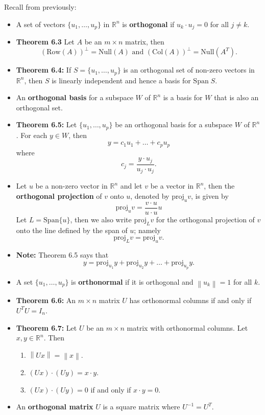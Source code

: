\documentclass[12pt,letterpaper]{article}
\newcommand{\norm}[1]{\left\lVert#1\right\rVert}
\begin{document}
\thispagestyle{fancy}

Recall from previously:

\begin{itemize}
\item 	A set of vectors $\{ u_1, \dots, u_p\}$ in $\mathbb{R}^n$ is {\bf orthogonal} if $u_k \cdot u_j=0$ for all $j\neq k$.
\item {\bf Theorem 6.3} Let $A$ be an $m\times n$ matrix, then $$(\text{Row}(A))^{\perp} = \text{Null}(A) \text{ and } (\text{Col}(A))^{\perp}= \text{Null}(A^{T}).$$
\item
{\bf Theorem 6.4:} If $S=\{ u_1, \dots, u_p\}$ is an orthogonal set of non-zero vectors in $\mathbb{R}^n$, then $S$ is linearly independent and hence a basis for $\text{Span} \; S$.
\item An {\bf orthogonal basis} for a subspace $W$ of $\mathbb{R}^n$ is a basis for $W$ that is also an orthogonal set.
\item {\bf Theorem 6.5:} Let $\{u_1, \dots,u_p\}$ be an orthogonal basis for a subspace $W$ of $\mathbb{R}^n$. For each $y\in W$, then $$y=c_1 u_1+\dots+c_p u_p$$ where $$c_j=\frac{y\cdot u_j}{u_j \cdot u_j}.$$
\item Let $u$ be a non-zero vector in $\mathbb{R}^n$ and let $v$ be a vector in $\mathbb{R}^n$, then the {\bf orthogonal projection} of $v$ onto $u$, denoted by $\text{proj}_{u}{v}$, is given by $$\text{proj}_{u}{v}=\frac{v\cdot u}{u \cdot u} u$$ Let $L=\text{Span}\{ u\}$, then we also write $\text{proj}_{L}{v}$ for the orthogonal projection of $v$ onto the line defined by the span of $u$; namely $$\text{proj}_{L}{v}=\text{proj}_{u}{v}.$$
\item {\bf Note:} Theorem 6.5 says that $$y=\text{proj}_{u_1}{y}+\text{proj}_{u_2}{y}+\dots+ \text{proj}_{u_p}{y}.$$
\item A set $\{u_1, \dots, u_p\}$ is {\bf orthonormal} if it is orthogonal and $\norm{u_k}=1$ for all $k$.
\item {\bf Theorem 6.6:} An $m\times n$ matrix $U$ has orthonormal columns if and only if $U^{T}U=I_n$.
\item {\bf Theorem 6.7:} Let $U$ be an $m\times n$ matrix with orthonormal columns. Let $x,y \in \mathbb{R}^n$. Then
\begin{enumerate}
\item $\norm{Ux}=\norm{x}$.
\item $(Ux)\cdot (Uy) = x \cdot y$.
\item $(Ux) \cdot (Uy)=0$ if and only if $x \cdot y=0$.
\end{enumerate}
\item An {\bf orthogonal matrix} $U$ is a square matrix where $U^{-1}=U^{T}$. 
\end{itemize}
\end{document}
